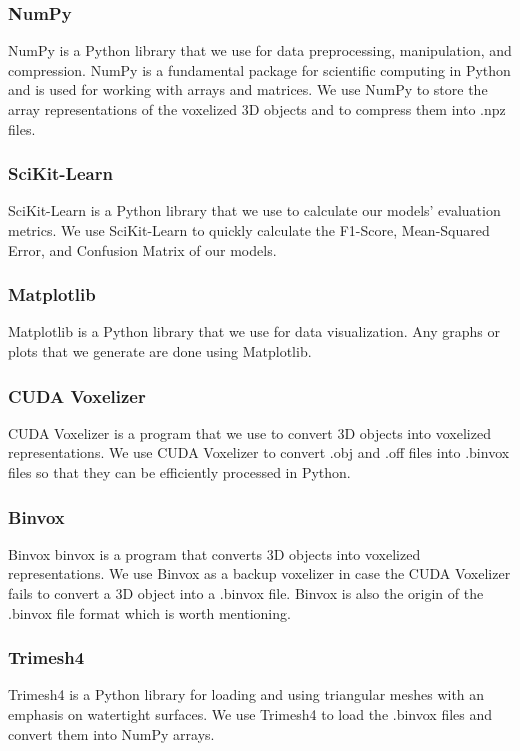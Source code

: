 \documentclass[conference]{IEEEtran}
\begin{document}
\subsubsection{NumPy}
NumPy \cite{harris2020array} is a Python library that we use for data preprocessing, manipulation, and compression. NumPy is a fundamental package for scientific computing in Python and is used for working with arrays and matrices. We use NumPy to store the array representations of the voxelized 3D objects and to compress them into .npz files.

\subsubsection{SciKit-Learn}
SciKit-Learn \cite{scikit-learn} is a Python library that we use to calculate our models' evaluation metrics. We use SciKit-Learn to quickly calculate the F1-Score, Mean-Squared Error, and Confusion Matrix of our models.

\subsubsection{Matplotlib}
Matplotlib \cite{Hunter:2007} is a Python library that we use for data visualization. Any graphs or plots that we generate are done using Matplotlib.

\subsubsection{CUDA Voxelizer}
CUDA Voxelizer \cite{math9182288} is a program that we use to convert 3D objects into voxelized representations. We use CUDA Voxelizer to convert .obj and .off files into .binvox files so that they can be efficiently processed in Python.

\subsubsection{Binvox}
Binvox {binvox} is a program that converts 3D objects into voxelized representations. We use Binvox as a backup voxelizer in case the CUDA Voxelizer fails to convert a 3D object into a .binvox file. Binvox is also the origin of the .binvox file format which is worth mentioning.

\subsubsection {Trimesh4}
Trimesh4 \cite{trimesh} is a Python library for loading and using triangular meshes with an emphasis on watertight surfaces. We use Trimesh4 to load the .binvox files and convert them into NumPy arrays.
\end{document}
